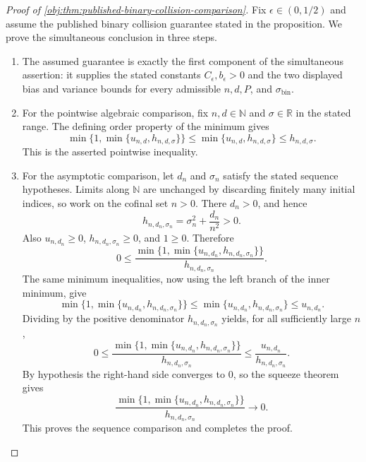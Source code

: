 \documentclass[11pt]{article}
\begin{document}
\begin{proof}[Proof of \cref{obj:thm:published-binary-collision-comparison}]
Fix \(\epsilon\in(0,1/2)\) and assume the published binary collision guarantee stated in the proposition.  We prove the simultaneous conclusion in three steps.

\begin{enumerate}
\item The assumed guarantee is exactly the first component of the simultaneous assertion: it supplies the stated constants \(C_\epsilon,b_\epsilon>0\) and the two displayed bias and variance bounds for every admissible \(n,d,P\), and \(\sigma_{\mathrm{bin}}\). %

\item For the pointwise algebraic comparison, fix \(n,d\in\mathbb N\) and \(\sigma\in\mathbb R\) in the stated range.  The defining order property of the minimum gives
\[
\min\{1,\min\{u_{n,d},h_{n,d,\sigma}\}\}
\le
\min\{u_{n,d},h_{n,d,\sigma}\}
\le
h_{n,d,\sigma}.
\]
This is the asserted pointwise inequality. %

\item For the asymptotic comparison, let \(d_n\) and \(\sigma_n\) satisfy the stated sequence hypotheses.  Limits along \(\mathbb N\) are unchanged by discarding finitely many initial indices, so work on the cofinal set \(n>0\).  There \(d_n>0\), and hence
\[
h_{n,d_n,\sigma_n}
=
\sigma_n^2+\frac{d_n}{n^2}
>
0.
\]
Also \(u_{n,d_n}\ge0\), \(h_{n,d_n,\sigma_n}\ge0\), and \(1\ge0\).  Therefore
\[
0
\le
\frac{\min\{1,\min\{u_{n,d_n},h_{n,d_n,\sigma_n}\}\}}
{h_{n,d_n,\sigma_n}}.
\]
The same minimum inequalities, now using the left branch of the inner minimum, give
\[
\min\{1,\min\{u_{n,d_n},h_{n,d_n,\sigma_n}\}\}
\le
\min\{u_{n,d_n},h_{n,d_n,\sigma_n}\}
\le
u_{n,d_n}.
\]
Dividing by the positive denominator \(h_{n,d_n,\sigma_n}\) yields, for all sufficiently large \(n\),
\[
0
\le
\frac{\min\{1,\min\{u_{n,d_n},h_{n,d_n,\sigma_n}\}\}}
{h_{n,d_n,\sigma_n}}
\le
\frac{u_{n,d_n}}{h_{n,d_n,\sigma_n}}.
\]
By hypothesis the right-hand side converges to \(0\), so the squeeze theorem gives
\[
\frac{\min\{1,\min\{u_{n,d_n},h_{n,d_n,\sigma_n}\}\}}
{h_{n,d_n,\sigma_n}}
\to0 .
\]
This proves the sequence comparison and completes the proof. %
\end{enumerate}
\end{proof}
\end{document}
